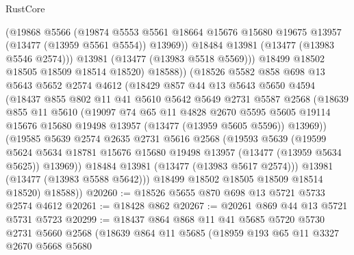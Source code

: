 \begin{lexlean}{RustCore}
\begin{coremodule}
                (@19868
                  @5566
                  (@19874
                    @5553
                    @5561
                    @18664
                    @15676
                    @15680
                    @19675
                    @13957
                    (@13477 (@13959 @5561 @5554))
                    @13969))
                @18484
                @13981
                (@13477 (@13983 @5546 @2574)))
              @13981
              (@13477 (@13983 @5518 @5569)))
            @18499
            @18502
            @18505
            @18509
            @18514
            @18520)
          @18588))
      (@18526
        @5582
        @858
        @698
        @13
        @5643
        @5652
        @2574
        @4612
        (@18429
          @857
          @44
          @13
          @5643
          @5650
          @4594
          (@18437
            @855
            @802
            @11
            @41
            @5610
            @5642
            @5649
            @2731
            @5587
            @2568
            (@18639
              @855
              @11
              @5610
              (@19097
                @74
                @65
                @11
                @4828
                @2670
                @5595
                @5605
                @19114
                @15676
                @15680
                @19498
                @13957
                (@13477 (@13959 @5605 @5596))
                @13969))
            (@19585
              @5639
              @2574
              @2635
              @2731
              @5616
              @2568
              (@19593
                @5639
                (@19599
                  @5624
                  @5634
                  @18781
                  @15676
                  @15680
                  @19498
                  @13957
                  (@13477 (@13959 @5634 @5625))
                  @13969))
              @18484
              @13981
              (@13477 (@13983 @5617 @2574)))
            @13981
            (@13477 (@13983 @5588 @5642)))
          @18499
          @18502
          @18505
          @18509
          @18514
          @18520)
        @18588))
@20260 := @18526 @5655 @870 @698 @13 @5721 @5733 @2574 @4612
@20261 := @18428 @862
@20267 := @20261 @869 @44 @13 @5721 @5731 @5723
@20299 := @18437
    @864
    @868
    @11
    @41
    @5685
    @5720
    @5730
    @2731
    @5660
    @2568
    (@18639
      @864
      @11
      @5685
      (@18959
        @193
        @65
        @11
        @3327
        @2670
        @5668
        @5680

\end{coremodule}
\end{lexlean}
